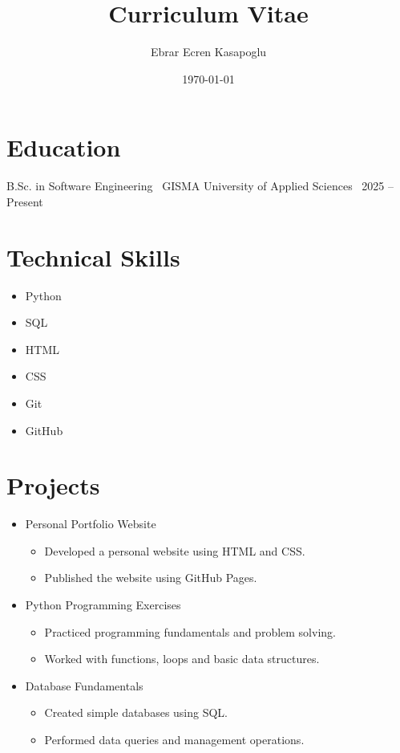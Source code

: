 \documentclass{article}
\begin{document}
\title{Curriculum Vitae}
\author{Ebrar Ecren Kasapoglu}
\date{\today}

\maketitle

\section*{Education}

B.Sc. in Software Engineering \
GISMA University of Applied Sciences \
2025 -- Present

\section*{Technical Skills}

\begin{itemize}
\item Python
\item SQL
\item HTML
\item CSS
\item Git
\item GitHub
\end{itemize}

\section*{Projects}

\begin{itemize}

\item Personal Portfolio Website
\begin{itemize}
\item Developed a personal website using HTML and CSS.
\item Published the website using GitHub Pages.
\end{itemize}

\item Python Programming Exercises
\begin{itemize}
\item Practiced programming fundamentals and problem solving.
\item Worked with functions, loops and basic data structures.
\end{itemize}

\item Database Fundamentals
\begin{itemize}
\item Created simple databases using SQL.
\item Performed data queries and management operations.
\end{itemize}

\end{itemize}
\end{document}
